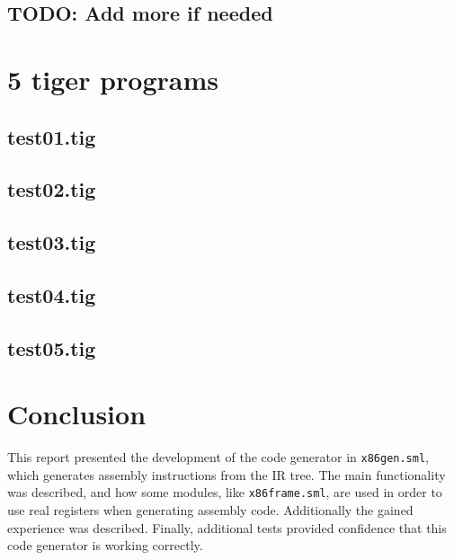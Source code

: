 \documentclass{article}
\begin{document}
\subsection{TODO: Add more if needed}

\section{5 tiger programs}

\subsection{test01.tig}



\subsection{test02.tig}



\subsection{test03.tig}



\subsection{test04.tig}



\subsection{test05.tig}



\section{Conclusion}

This report presented the development of the code generator in \texttt{x86gen.sml}, which generates assembly instructions from the IR tree. The main functionality was described, and how some modules, like \texttt{x86frame.sml}, are used in order to use real registers when generating assembly code. Additionally the gained experience was described. Finally, additional tests provided confidence that this code generator is working correctly.
\end{document}
